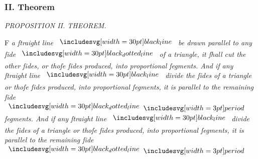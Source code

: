 \documentclass[11pt,preview]{standalone}
\begin{document}
\subsubsection{II. Theorem}

\begin{minipage}[t]{0.43\textwidth}
    \vspace{20pt}
    
\end{minipage}%
\hfill
\begin{minipage}[t]{0.54\textwidth}
    \begin{center}
        \textit{PROPOSITION II. THEOREM.}\label{book6pr2} \\
    \end{center}

    \hfill

    \begin{center}
        \raggedright \lettrine[lines=3, loversize=1, nindent=0pt]{}{}F \textit{a ſtraight line} $\blackline$ \textit{be drawn parallel to any ſide} $\dottedblackline$ \textit{of a triangle, it ſhall cut the other ſides, or thoſe ſides produced, into proportional ſegments. And if any ſtraight line} $\blackline$ \textit{divide the ſides of a triangle or thoſe ſides produced, into proportional ſegments, it is parallel to the remaining ſide} $\dottedblackline \bperiod$ \textit{ſegments. And if any ſtraight line} $\blackline$ \textit{divide the ſides of a triangle or thoſe ſides produced, into proportional ſegments, it is parallel to the remaining ſide} $\dottedblackline \bperiod$
    \end{center}
\end{minipage}

\hfill
\end{document}
